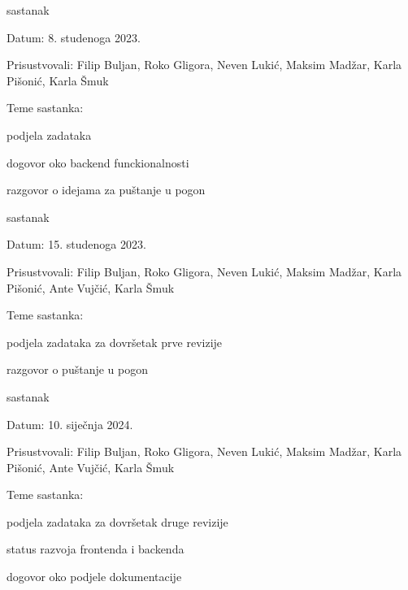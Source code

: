 \begin{packed_enum}
			\item  sastanak
			\item[] \begin{packed_item}
				\item Datum: 8. studenoga 2023.
				\item Prisustvovali: Filip Buljan, Roko Gligora, Neven Lukić, Maksim Madžar, Karla Pišonić, Karla Šmuk
				\item Teme sastanka:
				\begin{packed_item}
					\item  podjela zadataka
					\item  dogovor oko backend funckionalnosti
					\item  razgovor o idejama za puštanje u pogon
				\end{packed_item}
			\end{packed_item}
		
			\item  sastanak
			\item[] \begin{packed_item}
				\item Datum: 15. studenoga 2023.
				\item Prisustvovali: Filip Buljan, Roko Gligora, Neven Lukić, Maksim Madžar, Karla Pišonić, Ante Vujčić, Karla Šmuk
				\item Teme sastanka:
				\begin{packed_item}
					\item  podjela zadataka za dovršetak prve revizije
					\item  razgovor o puštanje u pogon
				\end{packed_item}
			\end{packed_item}
		
			\item  sastanak
			\item[] \begin{packed_item}
				\item Datum: 10. siječnja 2024.
				\item Prisustvovali: Filip Buljan, Roko Gligora, Neven Lukić, Maksim Madžar, Karla Pišonić, Ante Vujčić, Karla Šmuk
				\item Teme sastanka:
				\begin{packed_item}
					\item  podjela zadataka za dovršetak druge revizije
					\item  status razvoja frontenda i backenda
					\item  dogovor oko podjele dokumentacije
				\end{packed_item}
			\end{packed_item}
			
			
		\end{packed_enum}
		
